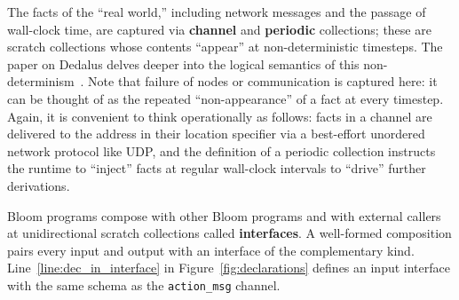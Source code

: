 The facts of the ``real world,'' including network messages and the passage of
wall-clock time, are captured via \textbf{channel} and \textbf{periodic}
collections; these are scratch collections whose contents ``appear'' at
non-deterministic timesteps.  The paper on Dedalus delves deeper into the
logical semantics of this non-determinism~\cite{dedalus}.  Note that failure of
nodes or communication is captured here: it can be thought of as the repeated
``non-appearance'' of a fact at every timestep.  Again, it is convenient to
think operationally as follows: facts in a channel are delivered to the
address in their location specifier via a best-effort unordered network protocol
like UDP, and the definition of a periodic collection instructs the
runtime to ``inject'' facts at regular wall-clock intervals to ``drive'' further
derivations.

Bloom programs compose with other Bloom programs and with external callers at
unidirectional scratch collections called \textbf{interfaces}.  A well-formed
composition pairs every input and output with an interface of the complementary
kind.  Line~\ref{line:dec_in_interface} in Figure~\ref{fig:declarations} defines
an input interface with the same schema as the \texttt{action\_msg} channel.

\begin{comment}
\begin{figure}[t]
\begin{scriptsize}
\begin{verbatim}
 1      class SimplePQueue < Bud
 2      def state
 3        table :q, ['id'], ['payload']
 4        table :min_id, ['id']
 5        table :log, ['id'], ['payload']
 6        scratch :newmins, ['id'], ['payload']
 7        channel :output, 0, ['addr', 'id'], ['payload']
 8      end
 9    
10      declare
11      def dequeue
12        # find min_id value, agg across all items (group=nil)
13        min_id <= q.group(nil, min(q.id))
14    
15        # find the q items with min_id via natural join
16        mins = natjoin [q, min_id] {|q, m| q }
17    
18        # idempotence: ignore items with id previously logged
19        newmins <= mins.map do |q| 
20          q unless log.map{|p| p.id}.include? q.id
21        end
22
23        # in the next timestep, add newmins to log, delete from q
24        log <+ newmins.map{|h| [h.id]}
25        q <- mins.map {|q| q}
26      
27        # ship the min items via the output channel
28        output <~ mins.map{|q| ['192.168.1.1:12345'] + q}
29      end
30    end
\end{verbatim}
\vspace{-10pt}
\caption{Example Bloom code for dequeuing items from a priority queue.}
\label{fig:queue}
\end{scriptsize}
\vspace{-2pt}
\end{figure}
\end{comment}


